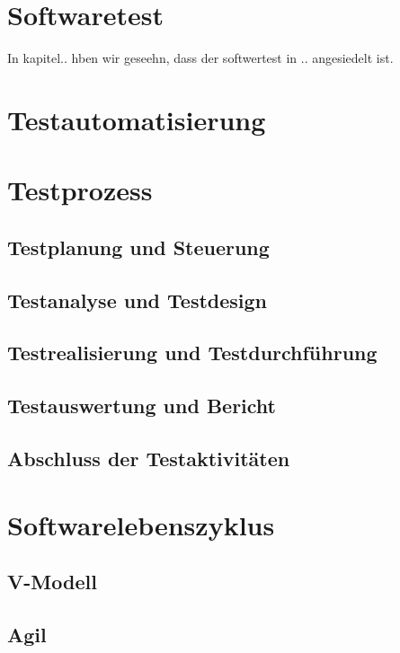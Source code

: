 \section{Softwaretest}
\label{sec:softwaretest}
In kapitel.. hben wir geseehn, dass der softwertest in .. angesiedelt ist.

\section{Testautomatisierung}
\label{sec:testautoGrundlagen}


\section{Testprozess}
\label{sec:testprozess}



\subsection{Testplanung und Steuerung}
\label{subsec:testplanung_und_steuerung}


\subsection{Testanalyse und Testdesign}
\label{subsec:testanalyse_und_design}


\subsection{Testrealisierung und Testdurchführung}
\label{subsec:testrealisierung_und_durchführung}

\subsection{Testauswertung und Bericht}
\label{subsec:testauswertung_und_bericht}


\subsection{Abschluss der Testaktivitäten}
\label{subsec:abschluss_der_testaktivitäten}



\section{Softwarelebenszyklus}
\label{sec:softwarelebenszyklus}



\subsection{V-Modell}
\label{subsec:vmodell}
\subsection{Agil}
\label{subsec:agil}

